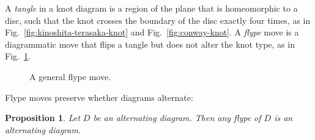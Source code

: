 \documentclass[12pt]{report}
\newtheorem*{proposition}{Proposition}
\theoremstyle{upright}
\begin{document}
A \textit{tangle} in a knot diagram is a region of the plane that is homeomorphic to a disc, such that the knot crosses the boundary of the disc exactly four times, as in Fig.~\ref{fig:kinoshita-terasaka-knot} and Fig.~\ref{fig:conway-knot}. A \textit{flype} move is a diagrammatic move that flips a tangle but does not alter the knot type, as in Fig.~\ref{fig:flype}.

\begin{figure}[hbt]
	\centering
	\def\svgscale{0.5}
	
	\caption{A general flype move.}
	\label{fig:flype}
\end{figure}

Flype moves preserve whether diagrams alternate:

\begin{proposition}
Let $D$ be an alternating diagram. Then any flype of $D$ is an alternating diagram.
\end{proposition}
\end{document}
